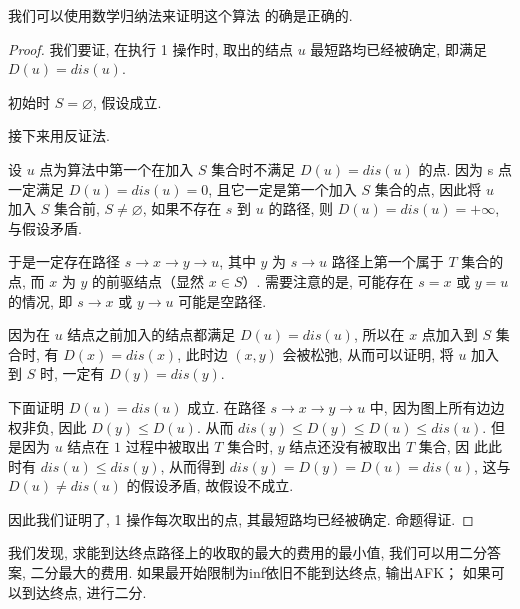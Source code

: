 我们可以使用数学归纳法来证明这个算法
的确是正确的. 

\begin{proof}
    我们要证, 在执行 1 操作时, 取出的结点 $u$ 最短路均已经被确定, 即满足 $D(u) = dis(u)$. 

初始时 $S = \varnothing$, 假设成立. 

接下来用反证法. 

设 $u$ 点为算法中第一个在加入 $S$ 集合时不满足 $D(u) = dis(u)$ 的点. 
因为 s 点一定满足 $D(u)=dis(u)=0$, 
且它一定是第一个加入 $S$ 集合的点, 因此将 $u$ 加入 $S$ 集合前, $S \neq \varnothing$, 
如果不存在 $s$ 到 $u$ 的路径, 则 $D(u) = dis(u) = +\infty$, 与假设矛盾. 

于是一定存在路径 $s \to x \to y \to u$, 其中 $y$ 为 $s \to u$ 路径上第一个属于 $T$
集合的点, 而 $x$ 为 $y$ 的前驱结点（显然 $x \in S$）. 需要注意的是, 可能存在 $s = x$ 或 
$y = u$ 的情况, 即 $s \to x$ 或 $y \to u$ 可能是空路径. 

因为在 $u$ 结点之前加入的结点都满足 $D(u) = dis(u)$, 所以在 $x$ 点加入到 $S$ 集合时, 
有 $D(x) = dis(x)$, 此时边 $(x,y)$ 会被松弛, 从而可以证明, 
将 $u$ 加入到 $S$ 时, 一定有 $D(y)=dis(y)$. 

下面证明 $D(u) = dis(u)$ 成立. 在路径 $s \to x \to y \to u$ 中, 
因为图上所有边边权非负, 因此 $D(y) \leq D(u)$. 从而 $dis(y) \leq D(y) \leq D(u)\leq dis(u)$. 
但是因为 $u$ 结点在 $1$ 过程中被取出 $T$ 集合时, $y$ 结点还没有被取出 $T$ 集合, 因
此此时有 $dis(u)\leq dis(y)$, 从而得到 $dis(y) = D(y) = D(u) = dis(u)$, 这与 
$D(u)\neq dis(u)$ 的假设矛盾, 故假设不成立. 

因此我们证明了, 1 操作每次取出的点, 其最短路均已经被确定. 命题得证. 
\end{proof}

 我们发现, 求能到达终点路径上的收取的最大的费用的最小值, 
我们可以用二分答案, 二分最大的费用. 如果最开始限制为inf依旧不能到达终点, 输出AFK；
如果可以到达终点, 进行二分.



